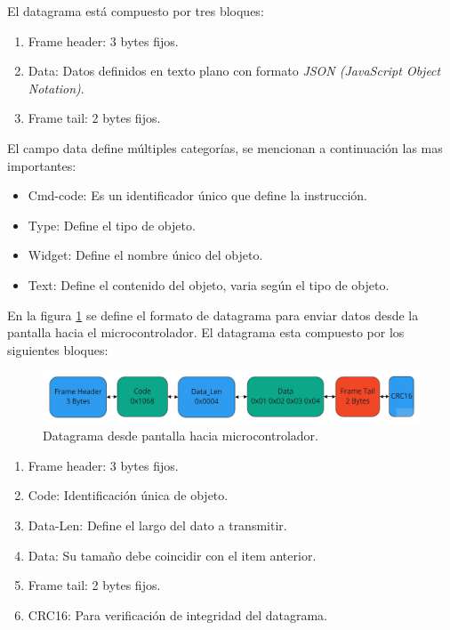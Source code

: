El datagrama está compuesto por tres bloques:
\begin{enumerate}
\item Frame header: 3 bytes fijos.
\item Data: Datos definidos en texto plano con formato \textit{JSON (JavaScript Object Notation)}.
\item Frame tail: 2 bytes fijos.
\end{enumerate}

El campo data define múltiples categorías, se mencionan a continuación las mas importantes:
\begin{itemize}
\item Cmd-code: Es un identificador único que define la instrucción.
\item Type: Define el tipo de objeto.
\item Widget: Define el nombre único del objeto.
\item Text: Define el contenido del objeto, varia según el tipo de objeto.
\end{itemize}  

En la figura \ref{fig:datagrama_a} se define el formato de datagrama para enviar datos desde la pantalla hacia el microcontrolador. El datagrama esta compuesto por los siguientes bloques:

\begin{figure}[h!]
	\centering
	\includegraphics[width=1\textwidth]{./Figures/datagrama_a.jpg}
	\caption{Datagrama desde pantalla hacia microcontrolador.}
	\label{fig:datagrama_a}
\end{figure}

\begin{enumerate}

\item Frame header: 3 bytes fijos.
\item Code: Identificación única de objeto.
\item Data-Len: Define el largo del dato a transmitir.
\item Data: Su tamaño debe coincidir con el item anterior.
\item Frame tail: 2 bytes fijos.
\item CRC16: Para verificación de integridad del datagrama.

\end{enumerate}

